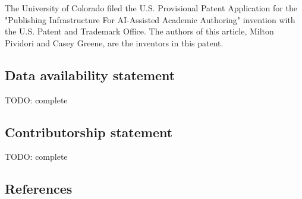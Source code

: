 \documentclass[
]{article}
\begin{document}
The University of Colorado filed the U.S. Provisional Patent Application for the "Publishing Infrastructure For AI-Assisted Academic Authoring" invention with the U.S. Patent and Trademark Office.
The authors of this article, Milton Pividori and Casey Greene, are the inventors in this patent.

\hypertarget{data-availability-statement}{%
\subsection{Data availability statement}\label{data-availability-statement}}

TODO: complete

\hypertarget{contributorship-statement}{%
\subsection{Contributorship statement}\label{contributorship-statement}}

TODO: complete

\hypertarget{references}{%
\subsection{References}\label{references}}
\end{document}
